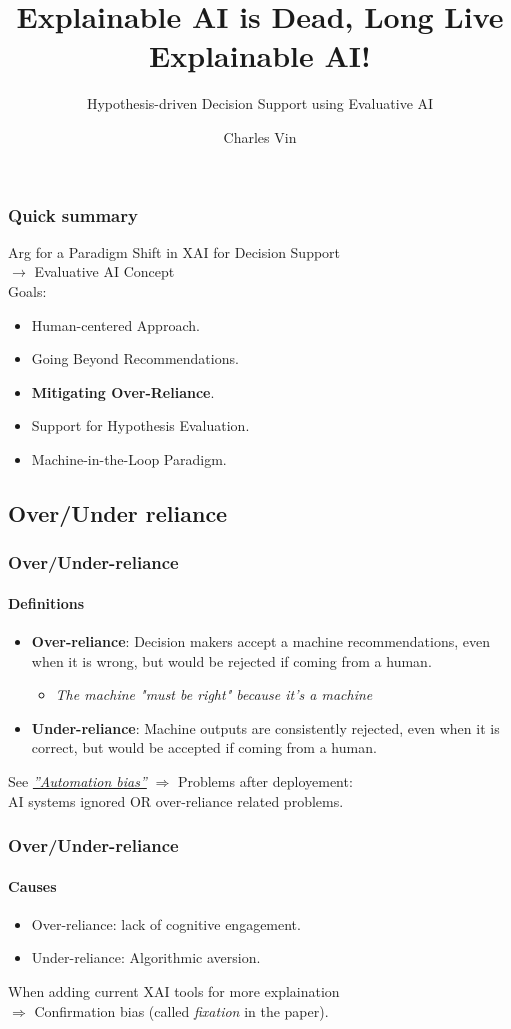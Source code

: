 \documentclass[compress,12pt]{beamer}
\title{Explainable AI is Dead, Long Live Explainable AI!}
\subtitle{Hypothesis-driven Decision Support using Evaluative AI}
\date{}
\author{\tiny Charles Vin}
\institute{\tiny Sorbonne Université - 21216136}
\begin{document}

\begin{frame}
      \frametitle{Quick summary}
      Arg for a Paradigm Shift in XAI for Decision Support \\
      $\rightarrow$ Evaluative AI Concept \\
      Goals:
      \begin{itemize}
            \item Human-centered Approach.
            \item Going Beyond Recommendations.
            \item \textbf{Mitigating Over-Reliance}.
            \item Support for Hypothesis Evaluation.
            \item Machine-in-the-Loop Paradigm.
      \end{itemize}
\end{frame}

\subsection{Over/Under reliance}
\begin{frame}
      \frametitle{Over/Under-reliance}
      \framesubtitle{Definitions}
      \begin{itemize}
            \item \textbf{Over-reliance}: Decision makers accept a machine recommendations, even when it is wrong, but would be rejected if coming from a human. \begin{itemize}
                  \item \textit{The machine "must be right" because it's a machine}
            \end{itemize}
            \item \textbf{Under-reliance}: Machine outputs are consistently rejected, even when it is correct, but would be accepted if coming from a human. 
      \end{itemize}
      See \href{https://en.wikipedia.org/wiki/Automation_bias}{\textit{''Automation bias''}}
      $ \Rightarrow  $ Problems after deployement: \\ 
      AI systems ignored OR over-reliance related problems.
\end{frame}

\begin{frame}
      \frametitle{Over/Under-reliance}
      \framesubtitle{Causes}
      \begin{itemize}
            \item Over-reliance: lack of cognitive engagement.
            \item Under-reliance: Algorithmic aversion.
      \end{itemize}
      When adding current XAI tools for more explaination \\
      $ \Rightarrow $ Confirmation bias (called \textit{fixation} in the paper).
\end{frame}
\end{document}
